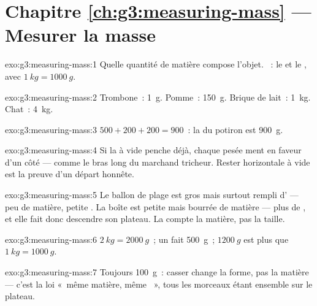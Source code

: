 \section*{Chapitre \ref{ch:g3:measuring-mass} --- Mesurer la masse}

\begin{solution}{exo:g3:measuring-mass:1}
Quelle quantité de matière compose l'objet. ~: le  et le
, avec $\qty{1}{kg} = \qty{1000}{g}$.
\end{solution}

\begin{solution}{exo:g3:measuring-mass:2}
Trombone~: \qty{1}{g}. Pomme~: \qty{150}{g}. Brique de lait~:
\qty{1}{kg}. Chat~: \qty{4}{kg}.
\end{solution}

\begin{solution}{exo:g3:measuring-mass:3}
$500 + 200 + 200 = 900$~: la  du potiron est \qty{900}{g}.
\end{solution}

\begin{solution}{exo:g3:measuring-mass:4}
Si la  à vide penche déjà, chaque pesée ment en faveur d'un
côté --- comme le bras long du marchand tricheur. Rester horizontale
à vide est la preuve d'un départ honnête.
\end{solution}

\begin{solution}{exo:g3:measuring-mass:5}
Le ballon de plage est gros mais surtout rempli d' --- peu de
matière, petite . La boîte est petite mais bourrée de
matière --- plus de , et elle fait donc descendre son plateau.
La  compte la matière, pas la taille.
\end{solution}

\begin{solution}{exo:g3:measuring-mass:6}
$\qty{2}{kg} = \qty{2000}{g}$~; un  fait
\qty{500}{g}~; $\qty{1200}{g}$ est plus que
$\qty{1}{kg} = \qty{1000}{g}$.
\end{solution}

\begin{solution}{exo:g3:measuring-mass:7}
Toujours \qty{100}{g}~: casser change la forme, pas la matière ---
c'est la loi «~même matière, même ~», tous les morceaux étant
ensemble sur le plateau.
\end{solution}

